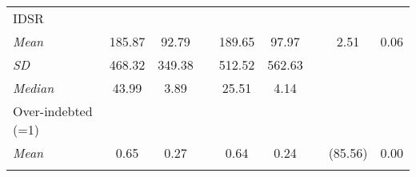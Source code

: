 \begin{table}[htbp]
{\begin{tabular}{lcccccccc}
    IDSR  &       &       &       &       &       &       &       &  \\
    \hspace*{0.1cm} \textit{Mean} & 185.87 & 92.79 &       & 189.65 & 97.97 &       & 2.51  & 0.06 \\
    \hspace*{0.1cm} \textit{SD} & 468.32 & 349.38 &       & 512.52 & 562.63 &       &       &  \\
    \hspace*{0.1cm} \textit{Median} & 43.99 & 3.89  &       & 25.51 & 4.14  &       &       &  \\
    Over-indebted (=1) &       &       &       &       &       &       &       &  \\
    \hspace*{0.1cm} \textit{Mean} & 0.65  & 0.27  &       & 0.64  & 0.24  &       & (85.56) & 0.00 \\
    \bottomrule
	\Tablenote{9}{} \\			
    \end{tabular}%
	}
  \label{tab:descY}%
\end{table}%
